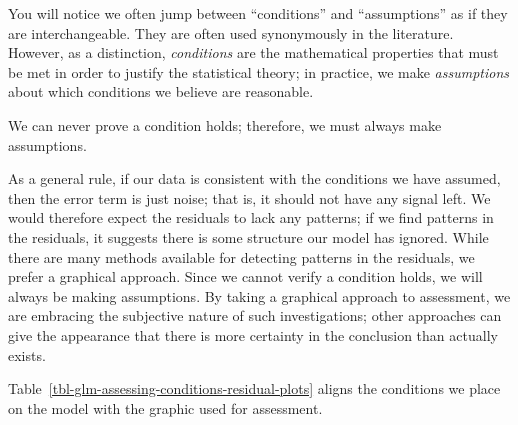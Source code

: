 \documentclass[
  letterpaper,
  DIV=11,
  numbers=noendperiod]{scrreprt}
\theoremstyle{definition}
\theoremstyle{definition}
\theoremstyle{remark}
\begin{document}
\begin{tcolorbox}[enhanced jigsaw, left=2mm, toprule=.15mm, arc=.35mm, breakable, opacitybacktitle=0.6, opacityback=0, rightrule=.15mm, colbacktitle=quarto-callout-note-color!10!white, coltitle=black, leftrule=.75mm, toptitle=1mm, colframe=quarto-callout-note-color-frame, titlerule=0mm, title=\textcolor{quarto-callout-note-color}{\faInfo}\hspace{0.5em}{Note}, bottomrule=.15mm, colback=white, bottomtitle=1mm]

You will notice we often jump between ``conditions'' and ``assumptions''
as if they are interchangeable. They are often used synonymously in the
literature. However, as a distinction, \emph{conditions} are the
mathematical properties that must be met in order to justify the
statistical theory; in practice, we make \emph{assumptions} about which
conditions we believe are reasonable.

We can never prove a condition holds; therefore, we must always make
assumptions.

\end{tcolorbox}

As a general rule, if our data is consistent with the conditions we have
assumed, then the error term is just noise; that is, it should not have
any signal left. We would therefore expect the residuals to lack any
patterns; if we find patterns in the residuals, it suggests there is
some structure our model has ignored. While there are many methods
available for detecting patterns in the residuals, we prefer a graphical
approach. Since we cannot verify a condition holds, we will always be
making assumptions. By taking a graphical approach to assessment, we are
embracing the subjective nature of such investigations; other approaches
can give the appearance that there is more certainty in the conclusion
than actually exists.

Table~\ref{tbl-glm-assessing-conditions-residual-plots} aligns the
conditions we place on the model with the graphic used for assessment.
\end{document}
